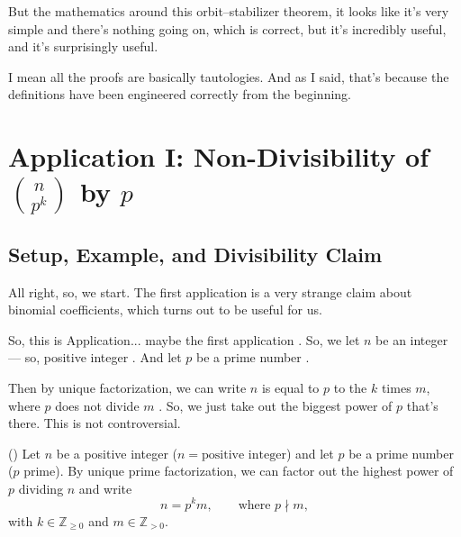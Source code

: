 \begin{hidden}
\end{hidden}

\begin{speech}[00:24:32 - 00:25:27]
But the mathematics around this orbit--stabilizer theorem, it looks like it's very simple and there's nothing going on, which is correct, but it's incredibly useful, and it's surprisingly useful.

I mean all the proofs are basically tautologies. And as I said, that's because the definitions have been engineered correctly from the beginning.
\end{speech}

\section{Application I: Non-Divisibility of \texorpdfstring{$\binom{n}{p^k}$}{Binomial Coefficients} by \texorpdfstring{$p$}{p}}

\subsection{Setup, Example, and Divisibility Claim}

\begin{speech}[00:25:27 - 00:26:14]
All right, so, we start. The first application is a very strange claim about binomial coefficients, which turns out to be useful for us.

So, this is Application... maybe the first application . So, we let $n$ be an integer --- so, positive integer . And let $p$ be a prime number .

Then by unique factorization, we can write $n$ is equal to $p$ to the $k$ times $m$, where $p$ does not divide $m$ . So, we just take out the biggest power of $p$ that's there. This is not controversial.
\end{speech}

\begin{content}
() Let $n$ be a positive integer ($n = \text{positive integer}$) and let $p$ be a prime number ($p$ prime). By unique prime factorization, we can factor out the highest power of $p$ dividing $n$ and write
\begin{equation}\label{eq:n-pk-m-decomp}
n = p^k m, \qquad \text{where } p \nmid m,
\end{equation}
with $k \in \mathbb{Z}_{\ge 0}$ and $m \in \mathbb{Z}_{>0}$.
\end{content}

